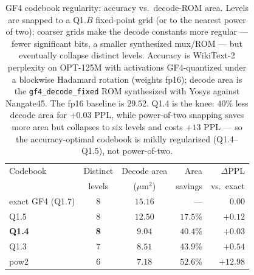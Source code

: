 \begin{table}[t]
  \centering
  \caption{GF4 codebook regularity: accuracy vs.\ decode-ROM area. Levels are
  snapped to a Q1.$B$ fixed-point grid (or to the nearest power of two); coarser
  grids make the decode constants more regular --- fewer significant bits, a
  smaller synthesized mux/ROM --- but eventually collapse distinct levels.
  Accuracy is WikiText-2 perplexity on OPT-125M with activations GF4-quantized
  under a blockwise Hadamard rotation (weights fp16); decode area is the
  \texttt{gf4\_decode\_fixed} ROM synthesized with Yosys against Nangate45. The
  fp16 baseline is $29.52$. Q1.4 is the knee: $40\%$ less decode area for
  $+0.03$ PPL, while power-of-two snapping saves more area but collapses to six
  levels and costs $+13$ PPL --- so the accuracy-optimal codebook is mildly
  regularized (Q1.4--Q1.5), not power-of-two.}
  \label{tab:regularity}
  \small
  \begin{tabular}{lccrr}
    \toprule
    Codebook & Distinct & Decode area & Area & $\Delta$PPL \\
             & levels   & ($\mu$m$^2$) & savings & vs.\ exact \\
    \midrule
    exact GF4 (Q1.7) & 8 & $15.16$ & ---       & $0.00$ \\
    Q1.5             & 8 & $12.50$ & $17.5\%$   & $+0.12$ \\
    \textbf{Q1.4}    & \textbf{8} & $\mathbf{9.04}$ & $\mathbf{40.4\%}$ & $\mathbf{+0.03}$ \\
    Q1.3             & 7 & $8.51$  & $43.9\%$   & $+0.54$ \\
    pow2             & 6 & $7.18$  & $52.6\%$   & $+12.98$ \\
    \bottomrule
  \end{tabular}
\end{table}
